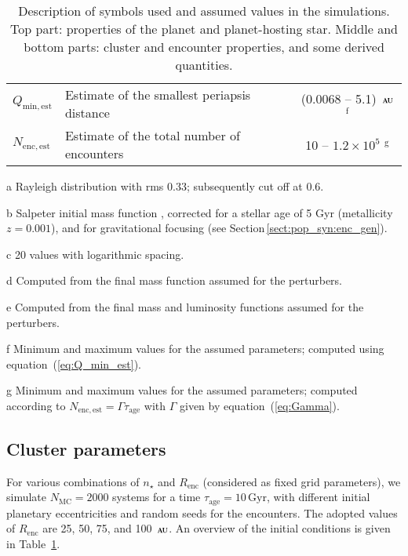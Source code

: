 \documentclass[iop,usenatbib]{emulateapj}
\renewcommand{\S}{Section}
\newcommand{\au}{\,\textsc{au}}
\newcommand{\renc}{R_\mathrm{enc}}
\begin{document}
\begin{table}
\begin{threeparttable}
\begin{tabular}{lp{3.2cm}c}
$Q_\mathrm{min,est}$		& Estimate of the smallest periapsis distance		& (0.0068 -- 5.1) $ \au$ ${}^\mathrm{f}$ \\
$N_\mathrm{enc,est}$ 		& Estimate of the total number of encounters 		& 10 -- $1.2\times 10^5$ ${}^\mathrm{g}$\\
\bottomrule
\end{tabular}
\begin{tablenotes}
            \item[a] Rayleigh distribution with rms 0.33; subsequently cut off at 0.6.
            \item[b] Salpeter initial mass function \citep{1955ApJ...121..161S}, corrected for a stellar age of 5 Gyr (metallicity $z=0.001$), and for gravitational focusing (see \S\,\ref{sect:pop_syn:enc_gen}).
            \item[c] 20 values with logarithmic spacing.
            \item[d] Computed from the final mass function assumed for the perturbers.
            \item[e] Computed from the final mass and luminosity functions assumed for the perturbers.
            \item[f] Minimum and maximum values for the assumed parameters; computed using equation~(\ref{eq:Q_min_est}).
            \item[g] Minimum and maximum values for the assumed parameters; computed according to $N_\mathrm{enc,est}=\Gamma \tau_\mathrm{age}$ with $\Gamma$ given by equation~(\ref{eq:Gamma}).
\end{tablenotes}
\caption{Description of symbols used and assumed values in the simulations. Top part: properties of the planet and planet-hosting star. Middle and bottom parts: cluster and encounter properties, and some derived quantities. }
\label{table:par}
\end{threeparttable}
\end{table}

\subsection{Cluster parameters}
\label{sect:pop_syn:results}

For various combinations of $n_\star$ and $\renc$ (considered as fixed grid parameters), we simulate $N_\mathrm{MC}=2000$ systems for a time $\tau_\mathrm{age}=10\,\mathrm{Gyr}$, with different initial planetary eccentricities and random seeds for the encounters. The adopted values of $\renc$ are 25, 50, 75, and 100 $\au$. An overview of the initial conditions is given in Table~\ref{table:par}.
\end{document}

